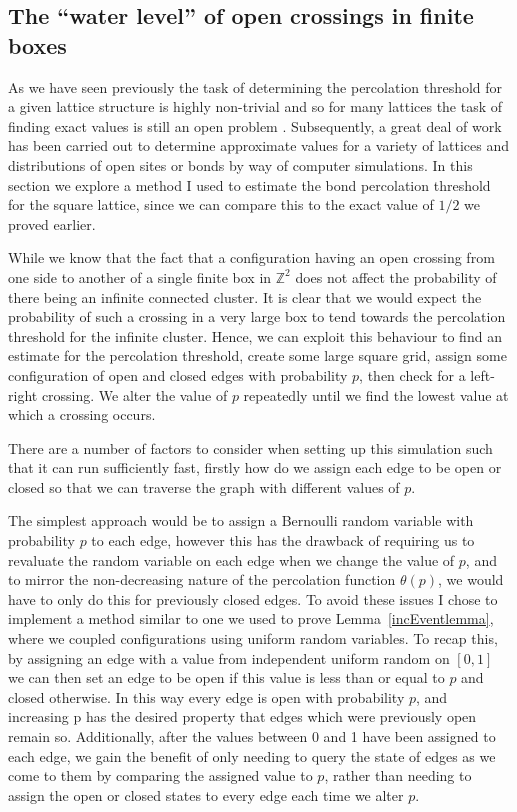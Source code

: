 \documentclass[a4paper,11pt]{article}
\theoremstyle{definition}
\newcommand{\ints}{\mathbb{Z}}
\begin{document}
\subsection{The ``water level'' of open crossings in finite boxes}

As we have seen previously the task of determining the percolation threshold for a given lattice structure is highly non-trivial and so for many lattices the task of finding exact values is still an open problem \cite{StoverThreshold}. Subsequently, a great deal of work has been carried out to determine approximate values for a variety of lattices and distributions of open sites or bonds by way of computer simulations. In this section we explore a method I used to estimate the bond percolation threshold for the square lattice, since we can compare this to the exact value of $1/2$ we proved earlier. 

While we know that the fact that a configuration having an open crossing from one side to another of a single finite box in $\ints^2$ does not affect the probability of there being an infinite connected cluster. It is clear that we would expect the probability of such a crossing in a very large box to tend towards the percolation threshold for the infinite cluster. Hence, we can exploit this behaviour to find an estimate for the percolation threshold, create some large square grid, assign some configuration of open and closed edges with probability $p$, then check for a left-right crossing. We alter the value of $p$ repeatedly until we find the lowest value at which a crossing occurs.

There are a number of factors to consider when setting up this simulation such that it can run sufficiently fast, firstly how do we assign each edge to be open or closed so that we can traverse the graph with different values of $p$.

The simplest approach would be to assign a Bernoulli random variable with probability $p$ to each edge, however this has the drawback of requiring us to revaluate the random variable on each edge when we change the value of $p$, and to mirror the non-decreasing nature of the percolation function $\theta(p)$, we would have to only do this for previously closed edges. To avoid these issues I chose to implement a method similar to one we used to prove Lemma~\ref{incEventlemma}, where we coupled configurations using uniform random variables. To recap this, by assigning an edge with a value from independent uniform random on $[0,1]$ we can then set an edge to be open if this value is less than or equal to $p$ and closed otherwise. In this way every edge is open with probability $p$, and increasing p has the desired property that edges which were previously open remain so. Additionally, after the values between 0 and 1 have been assigned to each edge, we gain the benefit of only needing to query the state of edges as we come to them by comparing the assigned value to $p$, rather than needing to assign the open or closed states to every edge each time we alter $p$.
\end{document}
